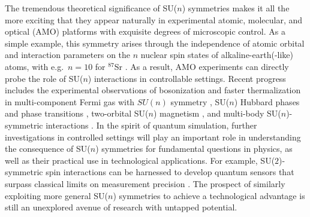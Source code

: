 \documentclass[aps,pra,nofootinbib,twocolumn,superscriptaddress]{revtex4-2}
\newcommand{\1}{\mathds{1}}
\begin{document}
The tremendous theoretical significance of SU($n$) symmetries makes it all the more exciting that they appear naturally in experimental atomic, molecular, and optical (AMO) platforms \cite{wu2003exact, cazalilla2009ultracold, gorshkov2010twoorbital, beverland2016realizing, cazalilla2014ultracold, taie2012su, hofrichter2016direct, cappellini2014direct, scazza2014observation, zhang2014spectroscopic, goban2018emergence, perlin2019effective} with exquisite degrees of microscopic control.
As a simple example, this symmetry arises through the independence of atomic orbital and interaction parameters on the $n$ nuclear spin states of alkaline-earth(-like) atoms, with e.g.~$n=10$ for ${}^{87}$Sr \cite{wu2003exact, cazalilla2009ultracold, cazalilla2014ultracold}.
As a result, AMO experiments can directly probe the role of SU($n$) interactions in controllable settings.
Recent progress includes the experimental observations of bosonization and faster thermalization in multi-component Fermi gas with $SU(n)$ symmetry \cite{song2020evidence, sonderhouse2020thermodynamics}, SU($n$) Hubbard phases and phase transitions \cite{taie2012su, hofrichter2016direct, taie2020observation}, two-orbital SU($n$) magnetism \cite{cappellini2014direct, scazza2014observation, zhang2014spectroscopic}, and multi-body SU($n$)-symmetric interactions \cite{goban2018emergence, perlin2019effective}.
In the spirit of quantum simulation, further investigations in controlled settings will play an important role in understanding the consequence of SU($n$) symmetries for fundamental questions in physics, as well as their practical use in technological applications.
For example, SU($2$)-symmetric spin interactions can be harnessed to develop quantum sensors that surpass classical limits on measurement precision \cite{he2019engineering, perlin2020spin}.
The prospect of similarly exploiting more general SU($n$) symmetries to achieve a technological advantage is still an unexplored avenue of research with untapped potential.
\end{document}
